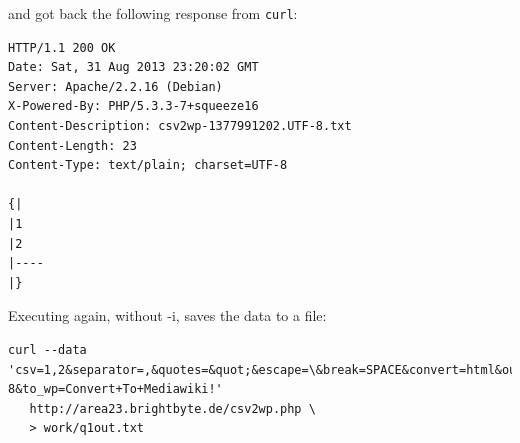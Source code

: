 \documentclass[letterpaper,11pt]{article}
\begin{document}
and got back the following response from \verb+curl+:
\begin{lstlisting}[frame=single]
HTTP/1.1 200 OK
Date: Sat, 31 Aug 2013 23:20:02 GMT
Server: Apache/2.2.16 (Debian)
X-Powered-By: PHP/5.3.3-7+squeeze16
Content-Description: csv2wp-1377991202.UTF-8.txt
Content-Length: 23
Content-Type: text/plain; charset=UTF-8

{|
|1
|2
|----
|}
\end{lstlisting}

Executing again, without -i, saves the data to a file:
\begin{lstlisting}[frame=single]
curl --data 'csv=1,2&separator=,&quotes=&quot;&escape=\&break=SPACE&convert=html&output_encoding=UTF-8&to_wp=Convert+To+Mediawiki!'
   http://area23.brightbyte.de/csv2wp.php \
   > work/q1out.txt
\end{lstlisting}
\end{document}

